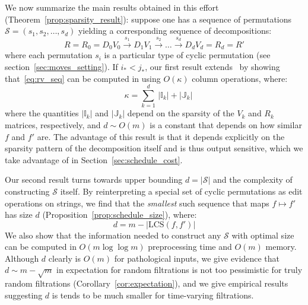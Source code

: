 \documentclass[sn-mathphys]{sn-jnl}
\begin{document}
We now summarize the main results obtained in this effort (Theorem~\ref{prop:sparsity_result}): suppose one has a sequence of permutations $\mathcal{S} = \left( s_1, s_2, \dots, s_d \right)$ yielding a corresponding sequence of decompositions:
  \begin{equation}\label{eq:rv_seq}
   	R = R_0 = D_0 V_0 \overset{s_1}{\to} D_1 V_{1} \overset{s_2}{\to} \dots \overset{s_d}{\to} D_d V_{d} = R_d = R'
 \end{equation}
 where each permutation $s_i$ is a particular type of cyclic permutation (see section~\ref{sec:moves_setting}). If $i_\ast < j_\ast$, our first result extends~\cite{busaryev2010tracking} by showing that~\eqref{eq:rv_seq} can be computed in using $O(\kappa)$ column operations, where: 
\begin{equation}
	\quad \kappa = \sum\limits_{k = 1}^d \, \lvert \mathbb{I}_{k}\rvert + \lvert \mathbb{J}_{k}\rvert 
\end{equation}
where the quantities $\lvert \mathbb{I}_{k} \rvert$ and $\lvert \mathbb{J}_{k} \rvert$ depend on the sparsity of the $V_k$ and $R_k$ matrices, respectively, and $d \sim O(m)$ is a constant that depends on how similar $f$ and $f'$ are. The advantage of this result is that it depends explicitly on the sparsity pattern of the decomposition itself and is thus output sensitive, which we take advantage of in Section~\ref{sec:schedule_cost}. 

Our second result turns towards upper bounding $d = \lvert \mathcal{S} \rvert$ and the complexity of constructing $\mathcal{S}$ itself. 
By reinterpreting a special set of cyclic permutations as edit operations on strings, we find that the \emph{smallest} such sequence that maps $f \mapsto f'$ has size $d$ (Proposition~\ref{prop:schedule_size}), where: 
\begin{equation}
	d = m - \lvert \mathrm{LCS}(f, f') \rvert 
\end{equation}
We also show that the information needed to construct any $\mathcal{S}$ with optimal size can be computed in $O(m \log \log m)$ preprocessing time and $O(m)$ memory. Although $d$ clearly is $O(m)$ for pathological inputs, we give evidence  that $d \sim m - \sqrt{m}$ in expectation for random filtrations is not too pessimistic for truly random filtrations (Corollary~\ref{cor:expectation}), and we give empirical results suggesting $d$ is tends to be much smaller for time-varying filtrations. 
\end{document}
